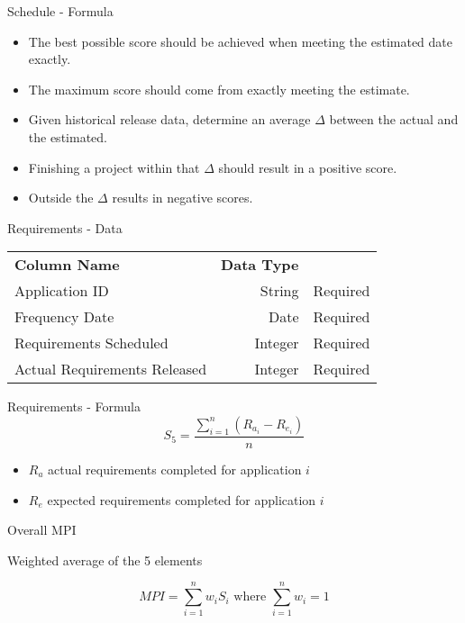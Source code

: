 \begin{frame}{Schedule - Formula}
    
    \begin{itemize}
    \item The best possible score should be achieved
            when meeting the estimated date exactly.
    \item The maximum score
            should come from exactly meeting the estimate.
    \item Given historical
            release data, determine an 
            average $\Delta$ between the actual and the estimated. 
    \item Finishing a project within that $\Delta$ should result 
            in a positive score.
    \item Outside the $\Delta$ results in
            negative scores. 
    \end{itemize}     
              
\end{frame}

\begin{frame}{Requirements - Data}
    
    \begin{tabular}{l | r | r}
        \textbf{Column Name} & \textbf{Data Type} &  \\
        
        Application ID & String  & Required \\
        Frequency Date & Date & Required \\
        Requirements Scheduled & Integer & Required \\
        Actual Requirements Released & Integer  & Required \\
    \end{tabular}
\end{frame}

\begin{frame}{Requirements - Formula}
    \[
        S_5 = \frac{\sum^n_{i=1}\left( R_{a_i} - R_{e_i} \right)}{n}
    \]
    \begin{itemize}
        \item $R_a$ actual requirements completed for application $i$
        \item $R_e$ expected requirements completed for application $i$
    \end{itemize}
\end{frame}

\begin{frame}{Overall MPI}

Weighted average of the 5 elements
    
\[
    MPI =\sum\limits^n_{i=1} w_i S_i \text{  where } \sum\limits^n_{i=1} w_i = 1
\]
\end{frame}

